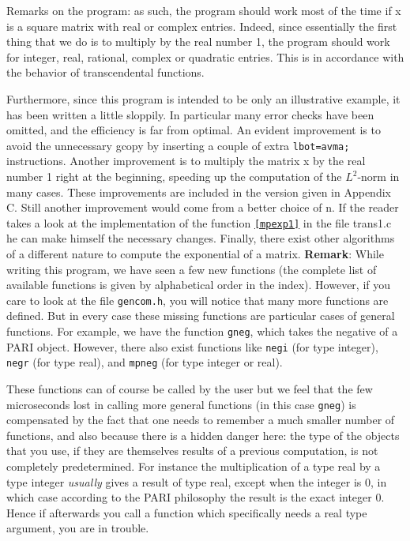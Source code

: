 Remarks on the program: as such, the program should work most of the time if
x is a square matrix with real or complex entries. Indeed, since essentially
the first thing that we do is to multiply by the real number 1, the program
should work for integer, real, rational, complex or quadratic entries. This
is in accordance with the behavior of transcendental functions.

Furthermore, since this program is intended to be only an illustrative 
example, it has been written a little sloppily. In particular many error checks
have been omitted, and the efficiency is far from optimal. An
evident improvement is to avoid the unnecessary gcopy by inserting a couple
of extra {\tt lbot=avma;} instructions. Another improvement is to multiply
the matrix x by the real number 1 right at the beginning, speeding up the
computation of the $L^2$-norm in many cases. These improvements are included
in the version given in Appendix C. Still
another improvement would come from a better choice of n. If the reader takes
a look at the implementation of the function {\tt \ref{mpexp1}} in the file trans1.c
he can make himself the necessary changes. Finally, there exist
other algorithms of a different nature to compute the exponential of a matrix.
\medskip
{\bf Remark}: While writing this program, we have seen a few new functions 
(the complete list of available functions is given by alphabetical order in the index). However, if you care to look at the file {\tt gencom.h}, you will notice that
many more functions are defined. But in every case these missing functions
are particular cases of general functions. For example, we have the function
{\tt gneg}, which takes the negative of a PARI object. However, there also 
exist functions like {\tt negi} (for type integer), {\tt negr} 
(for type real), and {\tt mpneg} (for type integer or real).

These functions can of course be called by the
user but we feel that the few microseconds lost in calling more general
functions (in this case {\tt gneg}) is compensated by the fact that one needs to
remember a much smaller number of functions, and also because there is a hidden
danger here: the type of the objects that you use, if they are themselves results
of a previous computation, is not completely predetermined. For instance the
multiplication of a type real by a type integer {\it usually\/} gives a result of
type real, except when the integer is 0, in which case according to the PARI
philosophy the result is the exact integer 0. Hence if afterwards you call a
function which specifically needs a real type argument, you are in trouble.

